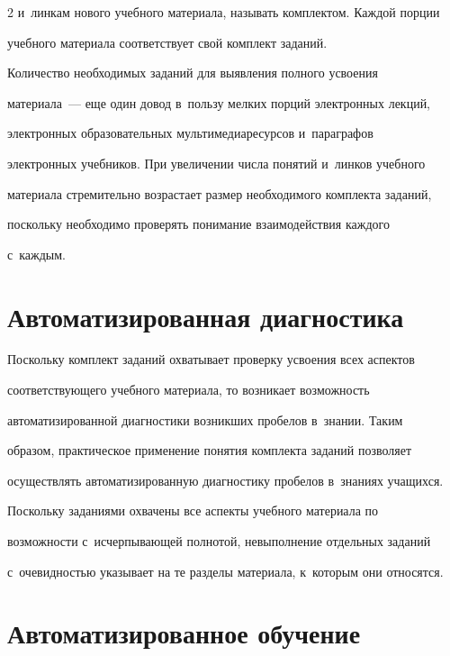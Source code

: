 \begin{multicols}{2}
и~линкам нового учебного материала, называть комплектом. Каждой порции 


учебного материала соответствует свой комплект заданий.


  


  Количество необходимых заданий для выявления полного усвоения 


материала~--- еще один довод в~пользу мелких порций электронных лекций, 


электронных образовательных мультимедиаресурсов и~параграфов 


электронных учебников. При увеличении числа понятий и~линков учебного 


материала стремительно возрастает размер необходимого комплекта заданий, 


поскольку необходимо проверять понимание взаимодействия каждого 


с~каждым.


  


\section{Автоматизированная диагностика }





  Поскольку комплект заданий охватывает проверку усвоения всех аспектов 


соответствующего учебного материала, то возникает возможность 


автоматизиро\-ванной диагностики возникших пробелов в~знании. Таким 


образом, практическое применение понятия комплекта заданий позволяет 


осуществлять автоматизированную диагностику пробелов в~знаниях учащихся. 


Поскольку заданиями охвачены все аспекты учебного материала по 


возможности с~исчерпывающей полнотой, невыполнение отдельных заданий 


с~очевидностью указывает на те разделы материала, к~которым они относятся.


  


\section{Автоматизированное обучение}






\end{multicols}
